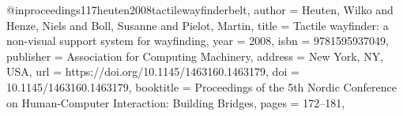 @inproceedings{117heuten2008tactilewayfinderbelt,
author = {Heuten, Wilko and Henze, Niels and Boll, Susanne and Pielot, Martin},
title = {Tactile wayfinder: a non-visual support system for wayfinding},
year = {2008},
isbn = {9781595937049},
publisher = {Association for Computing Machinery},
address = {New York, NY, USA},
url = {https://doi.org/10.1145/1463160.1463179},
doi = {10.1145/1463160.1463179},
booktitle = {Proceedings of the 5th Nordic Conference on Human-Computer Interaction: Building Bridges},
pages = {172–181},
}
